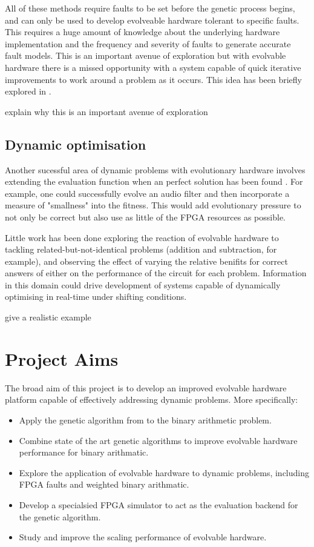All of these methods require faults to be set before the genetic process begins, and can only be used to
develop evolveable hardware tolerant to specific faults. This requires a huge amount of knowledge
about the underlying hardware implementation and the frequency and severity of faults to generate
accurate fault models. This
is an important avenue of exploration but with evolvable hardware there is a missed
opportunity with a system capable of quick iterative improvements to work around
a problem as it occurs. This idea has been briefly explored in \cite{10.1007/3-540-61093-6_6}.

\todo explain why this is an important avenue of exploration

\subsection{Dynamic optimisation}
Another sucessful area of dynamic problems with evolutionary hardware involves
extending the evaluation function when an perfect solution has been found \cite{785435}. For example,
one could successfully evolve an audio filter and then incorporate a measure of "smallness"
into the fitness. This would add evolutionary pressure to not only be correct but also
use as little of the FPGA resources as possible.

Little work has been done exploring the reaction of evolvable hardware to tackling
related-but-not-identical problems (addition and subtraction, for example), and observing
the effect of varying
the relative benifits for correct answers of either on the performance of the circuit for each problem.
Information in this domain could
drive development of systems capable of dynamically optimising in real-time
under shifting conditions.

\todo give a realistic example

\section{Project Aims}

The broad aim of this project is to develop an improved evolvable hardware
platform capable of effectively addressing dynamic problems. More specifically:
\begin{itemize}
	\item Apply the genetic algorithm from \cite{10.1007/3-540-63173-9_61} to
		the binary arithmetic problem.
	\item Combine state of the art genetic algorithms to improve
		evolvable hardware performance for binary arithmatic.
	\item Explore the application of evolvable hardware to dynamic
		problems, including FPGA faults and weighted binary arithmatic.
	\item Develop a specialsied FPGA simulator to act as the evaluation
		backend for the genetic algorithm.
	\item Study and improve the scaling performance of evolvable hardware.
\end{itemize}

